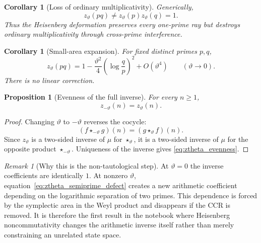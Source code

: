 \documentclass[11pt]{amsart}
\numberwithin{equation}{section}
\theoremstyle{plain}
\newtheorem{proposition}[theorem]{Proposition}
\newtheorem{corollary}[theorem]{Corollary}
\theoremstyle{definition}
\theoremstyle{remark}
\newtheorem{remark}[theorem]{Remark}
\begin{document}
\begin{corollary}[Loss of ordinary multiplicativity]
\label{cor:loss_of_multiplicativity}
Generically,
\begin{equation}
z_{\vartheta}(pq)
\neq
z_{\vartheta}(p)z_{\vartheta}(q)=1.
\label{eq:loss_of_multiplicativity}
\end{equation}
Thus the Heisenberg deformation preserves every one-prime ray but destroys
ordinary multiplicativity through cross-prime interference.
\end{corollary}

\begin{corollary}[Small-area expansion]
\label{cor:small_area_expansion}
For fixed distinct primes $p,q$,
\begin{equation}
z_{\vartheta}(pq)
=
1-
\frac{\vartheta^2}{4}
\left(\log\frac{q}{p}\right)^2
+O(\vartheta^4)
\qquad(\vartheta\to0).
\label{eq:small_theta_pq}
\end{equation}
There is no linear correction.
\end{corollary}

\begin{proposition}[Evenness of the full inverse]
\label{prop:theta_evenness}
For every $n\ge1$,
\begin{equation}
z_{-\vartheta}(n)=z_{\vartheta}(n).
\label{eq:ztheta_evenness}
\end{equation}
\end{proposition}

\begin{proof}
Changing $\vartheta$ to $-\vartheta$ reverses the cocycle:
\begin{equation}
(f\star_{-\vartheta}g)(n)
=
(g\star_{\vartheta}f)(n).
\label{eq:opposite_algebra_identity}
\end{equation}
Since $z_{\vartheta}$ is a two-sided inverse of $\mu$ for
$\star_{\vartheta}$, it is a two-sided inverse of $\mu$ for the opposite
product $\star_{-\vartheta}$.  Uniqueness of the inverse gives
\eqref{eq:ztheta_evenness}.
\end{proof}

\begin{remark}[Why this is the non-tautological step]
\label{rem:non_tautological_step}
At $\vartheta=0$ the inverse coefficients are identically $1$.  At nonzero
$\vartheta$, equation~\eqref{eq:ztheta_semiprime_defect} creates a new
arithmetic coefficient depending on the logarithmic separation of two
primes.  This dependence is forced by the symplectic area in the Weyl
product and disappears if the CCR is removed.  It is therefore the first
result in the notebook where Heisenberg noncommutativity changes the
arithmetic inverse itself rather than merely constraining an unrelated
state space.
\end{remark}
\end{document}

